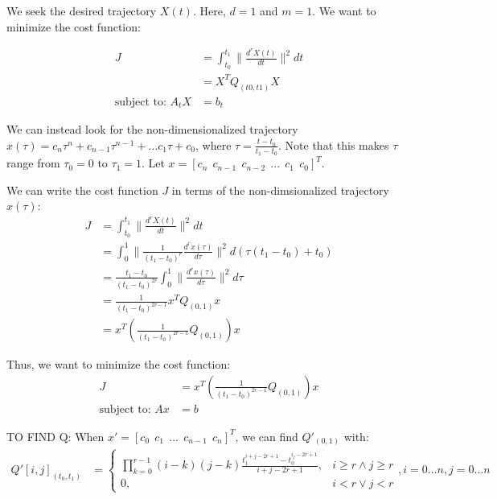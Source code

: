 \documentclass[11pt]{article}
\begin{document}
\mbox{} \newline
We seek the desired trajectory $X(t)$. Here, $d = 1$ and $m = 1$. We want to minimize the cost function:

\begin{align*}
J &= \int_{t_0}^{t_1} \|  \frac{d^{r} X(t) }{dt} \|^2 dt  \\
&= X^T Q_{(t0, t1)} X \\
\text{subject to: } A_t X &= b_t
\end{align*}

We can instead look for the non-dimensionalized trajectory $x(\tau) = c_n \tau^n + c_{n-1} \tau^{n-1} + ... c_1 \tau + c_0$, where $\tau = \frac{t-t_0}{t_1-t_0}$. Note that this makes $\tau$ range from $\tau_0 = 0$ to $\tau_1 = 1$. Let $x = [c_n \ \ c_{n-1} \ \ c_{n-2} \ \ ... \ \ c_1 \ \ c_0]^T$. 

\mbox{} \newline
We can write the cost function $J$ in terms of the non-dimsionalized trajectory $x(\tau)$: 
\begin{align*}
J &= \int_{t_0}^{t_1} \|  \frac{d^{r} X(t) }{dt} \|^2 dt  \\
&= \int_{0}^{1} \|  \frac{1}{(t_1-t_0)^r} \frac{d^{r} x(\tau) }{d\tau} \|^2 d (\tau (t_1-t_0)+t_0) \\
&=  \frac{t_1-t_0}{(t_1-t_0)^{2r}} \int_{0}^{1} \| \frac{d^{r} x(\tau) }{d\tau} \|^2 d \tau \\
&= \frac{1}{(t_1-t_0)^{2r-1}} x^T Q_{(0, 1)} x \\
&= x^T \left( \frac{1}{(t_1-t_0)^{2r-1}} Q_{(0, 1)}\right) x
\end{align*}

Thus, we want to minimize the cost function: 
\begin{align*}
J &= x^T \left( \frac{1}{(t_1-t_0)^{2r-1}} Q_{(0, 1)}\right) x \\
\text{subject to: } A x &= b
\end{align*}

\mbox{} \newline
\mbox{} \newline
TO FIND Q: \newline
When $x' = [c_0 \ \ c_1 \ \ ... \ \ c_{n-1} \ \ c_n]^T$, we can find $Q'_{(0, 1)}$ with: 
\begin{align}
\label{eqn: Q}  Q'[i, j]_{(t_0, t_1)} &= 
\begin{cases}
    \prod_{k = 0}^{r-1} {(i-k)(j-k)} \frac{ t_1^{i+j-2r+1} - t_0^{i_j-2r+1} }{i+j-2r+1}, & i \ge r \land j \ge r \\
    0, & i < r \lor j < r 
\end{cases}, i = 0...n, j = 0...n
\end{align}
\end{document}

